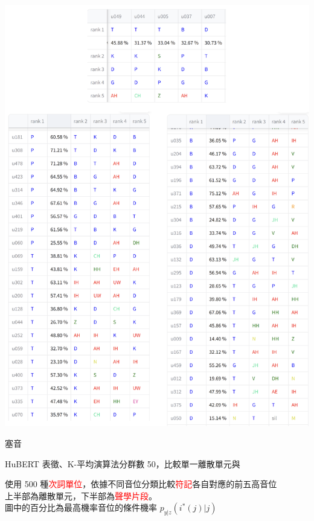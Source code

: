     {
        \begin{table}
            \centering
            \begin{subtable}{\textwidth}
                \centering
                \includegraphics[width=0.8\linewidth]{figures/ch4figs/plo_phn.png}
                \caption{塞音}
                \label{fig:hub-u050-ap0500-ploobs}
            \end{subtable}

            \caption{HuBERT 表徵、K-平均演算法分群數 50，比較單一離散單元與}
            使用 500 種\textcolor{red}{次詞單位}，依據不同音位分類比較\textcolor{red}{符記}各自對應的前五高音位 \\
            上半部為離散單元，下半部為\textcolor{red}{聲學片段}。 \\
            圖中的百分比為最高機率音位的條件機率 $p_{y|z}(i^*(j)|j)$
            \label{fig:hub-u050-phnobserver}
        \end{table}

}
